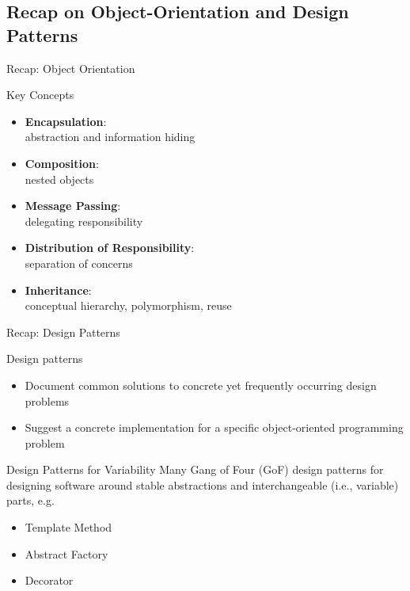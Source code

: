 
\subsection{Recap on Object-Orientation and Design Patterns}

\begin{frame}{Recap: Object Orientation}
	\begin{mycolumns}[height=50mm]
		\begin{definition}{Key Concepts}
			\begin{itemize}
				\item \textbf{Encapsulation}:\\abstraction and information hiding
				\item \textbf{Composition}:\\nested objects
				\item \textbf{Message Passing}:\\delegating responsibility
				\item \textbf{Distribution of Responsibility}:\\separation of concerns
				\item \textbf{Inheritance}:\\conceptual hierarchy, polymorphism, reuse
			\end{itemize}
		\end{definition}
	\mynextcolumn
	\end{mycolumns}
\end{frame}

\begin{frame}{Recap: Design Patterns\ \mytitlesource{\gof}}
	\begin{mycolumns}[widths={60}]
		\begin{definition}{Design patterns }
			\begin{itemize}
				\item Document common solutions to concrete yet frequently occurring design problems
				\item Suggest a concrete implementation for a specific object-oriented programming problem
			\end{itemize}
		\end{definition}	
		\begin{note}{Design Patterns for Variability}
			Many Gang of Four (GoF) design patterns for designing software around stable abstractions and interchangeable (i.e., variable) parts, e.g.
			\begin{itemize}
				\item Template Method
				\item Abstract Factory
				\item Decorator
			\end{itemize}
		\end{note}
	\mynextcolumn
	\end{mycolumns}
\end{frame}


